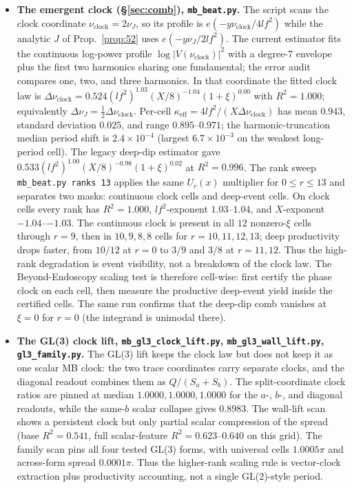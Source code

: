 \documentclass[11pt]{article}
\theoremstyle{definition}
\begin{document}
\begin{itemize}
\item \textbf{The emergent clock (\S\ref{sec:comb}), \texttt{mb\_beat.py}.} The script scans the clock
coordinate $\nu_{\mathrm{clock}}=2\nu_J$, so its profile is
$e(-y\nu_{\mathrm{clock}}/4lf^2)$ while the analytic $J$ of Prop.~\ref{prop:52} uses
$e(-y\nu_J/2lf^2)$. The current estimator fits the continuous log-power profile
$\log|V(\nu_{\mathrm{clock}})|^2$ with a degree-$7$ envelope plus the first two harmonics sharing one
fundamental; the error audit compares one, two, and three harmonics. In that coordinate the fitted
clock law is
$\Delta\nu_{\mathrm{clock}}=0.524(lf^2)^{1.03}(X/8)^{-1.04}(1+\xi)^{0.00}$ with $R^2=1.000$; equivalently
$\Delta\nu_J=\tfrac12\Delta\nu_{\mathrm{clock}}$. Per-cell
$\kappa_{\mathrm{eff}}=4lf^2/(X\Delta\nu_{\mathrm{clock}})$ has mean $0.943$, standard deviation $0.025$,
and range $0.895$--$0.971$; the harmonic-truncation median period shift is $2.4\times10^{-4}$ (largest
$6.7\times10^{-3}$ on the weakest long-period cell). The legacy deep-dip estimator gave
$0.533(lf^2)^{1.00}(X/8)^{-0.98}(1+\xi)^{0.02}$ at $R^2=0.996$. The rank sweep
\texttt{mb\_beat.py ranks 13} applies the same $U_r(x)$ multiplier for $0\le r\le13$ and separates two masks:
continuous clock cells and deep-event cells. On clock cells every rank has $R^2=1.000$, $lf^2$-exponent
$1.03$--$1.04$, and $X$-exponent $-1.04$--$-1.03$. The continuous clock is present in all $12$ nonzero-$\xi$
cells through $r=9$, then in $10,9,8,8$ cells for $r=10,11,12,13$; deep productivity drops faster, from
$10/12$ at $r=0$ to $3/9$ and $3/8$ at $r=11,12$. Thus the high-rank degradation is event visibility, not a
breakdown of the clock law. The Beyond-Endoscopy scaling test is therefore cell-wise: first certify the
phase clock on each cell, then measure the productive deep-event yield inside the certified cells. The same run confirms that the deep-dip comb vanishes at $\xi=0$ for $r=0$
(the integrand is unimodal there).

\item \textbf{The GL(3) clock lift, \texttt{mb\_gl3\_clock\_lift.py},
\texttt{mb\_gl3\_wall\_lift.py}, \texttt{gl3\_family.py}.} The GL(3) lift keeps the clock law but
does not keep it as one scalar MB clock: the two trace coordinates carry separate clocks, and the diagonal
readout combines them as $Q/(S_a+S_b)$. The split-coordinate clock ratios are pinned at median
$1.0000,1.0000,1.0000$ for the $a$-, $b$-, and diagonal readouts, while the same-$b$ scalar collapse gives
$0.8983$. The wall-lift scan shows a persistent clock but only partial scalar compression of the spread
(base $R^2=0.541$, full scalar-feature $R^2=0.623$--$0.640$ on this grid). The family scan pins all four
tested GL(3) forms, with universal cells $1.0005\pi$ and across-form spread $0.0001\pi$. Thus the higher-rank
scaling rule is vector-clock extraction plus productivity accounting, not a single GL(2)-style period.


\end{itemize}
\end{document}
